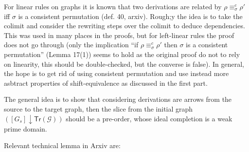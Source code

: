\documentclass{llncs}
\newcommand{\slice}[2]{\ensuremath{({#1} \downarrow {#2})}}
\newcommand{\tr}[1]{\ensuremath{\mathsf{Tr}({#1})}}
\begin{document}
For linear rules on graphs it is known that two derivations are
related by $\rho \equiv^c_\sigma \rho'$ iff $\sigma$ is a consistent
permutation (def. 40, arxiv). Rough;y the idea is to take the colimit
and consider the rewriting steps over the colimit to deduce
dependencies. This was used in many places in the proofs, but for
left-linear rules the proof does not go through (only the implication
``if $\rho \equiv^c_\sigma \rho'$ then $\sigma$ is a consistent
permutation'' (Lemma 17(1)) seems to hold as the original proof do not
to rely on linearity, this should be double-checked, but the converse
is false). In general, the hope is to get rid of using consistent
permutation and use instead more asbtract properties of
shift-equivalence as discussed in the first part.

The general idea is to show that considering derivations are arrows from the source to the target graph, then the slice from the initial graph $\slice{[G_s]}{\tr{\mathcal{G}}}$ should be a pre-order, whose ideal completion is a weak prime domain.

Relevant technical lemma in Arxiv are:
\end{document}
